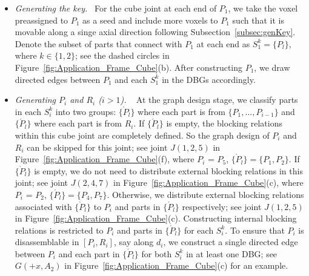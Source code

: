 \begin{itemize}[leftmargin=*]
	
	\vspace*{1.0mm}
	\item 
	{\em Generating the key.} \
	For the cube joint at each end of $P_1$, we take the voxel preassigned to $P_1$ as a seed and include more voxels to $P_1$ such that it is movable along a singe axial direction following Subsection~\ref{subsec:genKey}.
	Denote the subset of parts that connect with $P_1$ at each end as $S_1^k = \{P_l\}$, where $k \in \{1, 2\}$; see the dashed circles in Figure~\ref{fig:Application_Frame_Cube}(b).
	After constructing $P_1$, we draw directed edges between $P_1$ and each $S_1^k$ in the DBGs accordingly.
	
	\vspace*{1.0mm}
	\item 
	{\em Generating $P_i$ and $R_i$ ($i>1$).} \
	At the graph design stage, we classify parts in each $S_i^k$ into two groups: $\{ \grave{P}_l \}$ where each part is from $\{P_1, ..., P_{i-1} \}$ and $\{ \acute{P}_l\}$ where each part is from $R_i$. 
	If $\{ \acute{P}_l\}$ is empty, the blocking relations within this cube joint are completely defined.
	So the graph design of $P_i$ and $R_i$ can be skipped for this joint; see joint $J(1,2,5)$ in Figure~\ref{fig:Application_Frame_Cube}(f), where $P_i$ = $P_5$, $\{ \grave{P}_l \} = \{P_1, P_2\}$.
	If $\{ \grave{P}_l \}$ is empty, we do not need to distribute external blocking relations in this joint; see joint $J(2,4,7)$ in Figure~\ref{fig:Application_Frame_Cube}(c), where  $P_i$ = $P_2$, $\{ \acute{P}_l \} = \{P_4, P_7\}$.
	Otherwise, we distribute external blocking relations associated with $\{ \grave{P}_l \}$ to $P_i$ and parts in $\{ \acute{P}_l\}$ respectively; see joint $J(1,2,5)$ in Figure~\ref{fig:Application_Frame_Cube}(c).
	Constructing internal blocking relations is restricted to $P_i$ and parts in $\{ \acute{P}_l\}$ for each $S_i^k$.
	To ensure that $P_i$ is disassemblable in $[P_i, R_i]$, say along $d_i$, we construct a single directed edge between $P_i$ and each part in $\{ \acute{P}_l\}$ for both $S_i^k$ in at least one DBG; see $G(+x, A_2)$ in Figure~\ref{fig:Application_Frame_Cube}(c) for an example.


\end{itemize}
